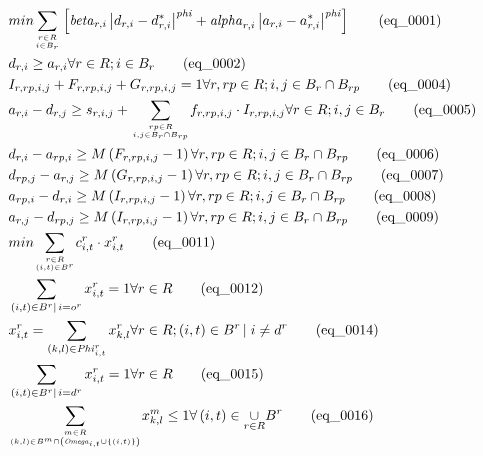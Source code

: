 \begin{align}
  & min \underset{\genfrac{}{}{0pt}{}{r \in R}{i \in B_{r}}}{\sum} \left[\mathit{beta}_{r , i} \left|d_{r , i} - d_{r , i}^{*}\right|^{\mathit{phi}} + \mathit{alpha}_{r , i} \left|a_{r , i} - a_{r , i}^{*}\right|^{\mathit{phi}}\right] \tag{eq\_0001} \\
  & d_{r , i} \geq a_{r , i} \forall r \in R ; i \in B_{r} \tag{eq\_0002} \\
  & I_{r , rp , i , j} + F_{r , rp , i , j} + G_{r , rp , i , j} = 1 \forall r , rp \in R ; i , j \in B_{r} \cap B_{rp} \tag{eq\_0004} \\
  & a_{r , i} - d_{r , j} \geq s_{r , i , j} + \underset{\genfrac{}{}{0pt}{}{rp \in R}{i , j \in B_{r} \cap B_{rp}}}{\sum} f_{r , rp , i , j} \cdot I_{r , rp , i , j} \forall r \in R ; i , j \in B_{r} \tag{eq\_0005} \\
  & d_{r , i} - a_{rp , i} \geq M \left(F_{r , rp , i , j} - 1\right) \forall r , rp \in R ; i , j \in B_{r} \cap B_{rp} \tag{eq\_0006} \\
  & d_{rp , j} - a_{r , j} \geq M \left(G_{r , rp , i , j} - 1\right) \forall r , rp \in R ; i , j \in B_{r} \cap B_{rp} \tag{eq\_0007} \\
  & a_{rp , i} - d_{r , i} \geq M \left(I_{r , rp , i , j} - 1\right) \forall r , rp \in R ; i , j \in B_{r} \cap B_{rp} \tag{eq\_0008} \\
  & a_{r , j} - d_{rp , j} \geq M \left(I_{r , rp , i , j} - 1\right) \forall r , rp \in R ; i , j \in B_{r} \cap B_{rp} \tag{eq\_0009} \\
  & min \underset{\genfrac{}{}{0pt}{}{r \in R}{\left(i , t\right) \in B^{r}}}{\sum} c_{i , t}^{r} \cdot x_{i , t}^{r} \tag{eq\_0011} \\
  & \sum_{\left(i , t\right) \in B^{r} \left|\right. i = o^{r}} x_{i , t}^{r} = 1 \forall r \in R \tag{eq\_0012} \\
  & x_{i , t}^{r} = \sum_{\left(k , l\right) \in \mathit{Phi}_{i , t}^{r}} x_{k , l}^{r} \forall r \in R ; \left(i , t\right) \in B^{r} \left|\right. i \neq d^{r} \tag{eq\_0014} \\
  & \sum_{\left(i , t\right) \in B^{r} \left|\right. i = d^{r}} x_{i , t}^{r} = 1 \forall r \in R \tag{eq\_0015} \\
  & \underset{\genfrac{}{}{0pt}{}{m \in R}{\left(k , l\right) \in B^{m} \cap \left(\mathit{Omega}_{i , t} \cup \left\{\left(i , t\right)\right\}\right)}}{\sum} x_{k , l}^{m} \leq 1 \forall \left(i , t\right) \in \underset{r \in R}{\cup} B^{r} \tag{eq\_0016} \\

\end{align}
